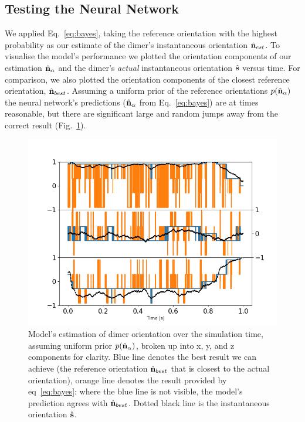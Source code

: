 \subsection{Testing the Neural Network}
\label{sec:test}
We applied Eq.~\eqref{eq:bayes}, taking the reference orientation 
with the highest probability  as our estimate of the dimer's 
instantaneous orientation $\hat{\bf n}_{est}$. To visualise the 
model's performance we plotted the orientation components of our 
estimation $\hat{\bf n}_{\alpha}$ and the dimer's \emph{actual} 
instantaneous orientation $\hat{\bf s}$ versus time. For comparison, 
we also plotted the orientation components of the closest reference orientation, $\hat{\bf n}_{best}$. Assuming a uniform prior of the 
reference orientations $p(\hat{\bf n}_\alpha)$ the neural network's predictions ($\hat{\bf n}_{\alpha}$ from Eq.~\eqref{eq:bayes}) are 
at times reasonable, but there are significant large and random jumps 
away from the correct result (Fig.~\ref{fig:uniform}). 
\begin{figure}[h!]
	\centering
	\includegraphics[width=\textwidth]{fig5.png}
	\caption{Model's estimation of dimer orientation over the simulation time, assuming uniform prior $p(\hat{\bf n}_\alpha)$, broken up into x, y, and z components for clarity. Blue line denotes the best result we can achieve (the reference orientation $\hat{\bf n}_{best}$ that is closest to the actual orientation), orange line denotes the result provided by eq~\ref{eq:bayes}: where the blue line is not visible, the model's prediction agrees with $\hat{\bf n}_{best}$. Dotted black line is the instantaneous orientation $\hat{\bf s}$.}
	\label{fig:uniform}
\end{figure} 

